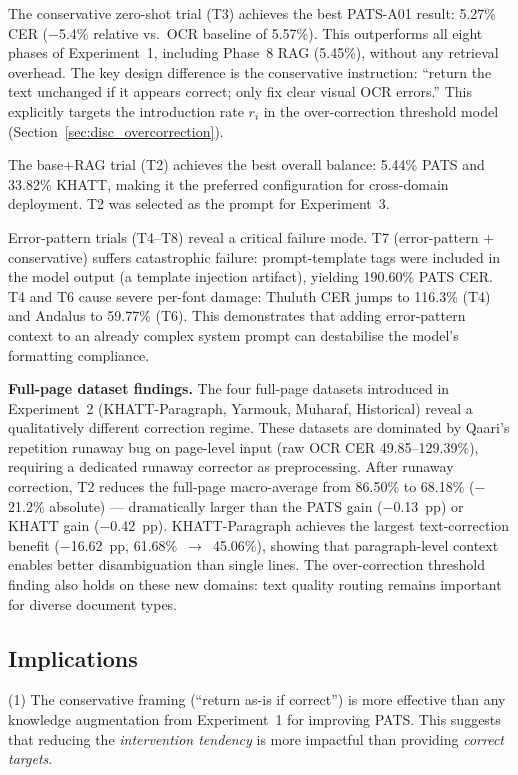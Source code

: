 The conservative zero-shot trial (T3) achieves the best PATS-A01 result:
5.27\% CER ($-$5.4\% relative vs.\ OCR baseline of 5.57\%). This outperforms
all eight phases of Experiment~1, including Phase~8 RAG (5.45\%), without
any retrieval overhead. The key design difference is the conservative
instruction: ``return the text unchanged if it appears correct; only fix
clear visual OCR errors.'' This explicitly targets the introduction rate
$r_i$ in the over-correction threshold model
(Section~\ref{sec:disc_overcorrection}).

The base+RAG trial (T2) achieves the best overall balance: 5.44\% PATS
and 33.82\% KHATT, making it the preferred configuration for cross-domain
deployment. T2 was selected as the prompt for Experiment~3.

Error-pattern trials (T4--T8) reveal a critical failure mode. T7
(error-pattern + conservative) suffers catastrophic failure: prompt-template
tags were included in the model output (a template injection artifact),
yielding 190.60\% PATS CER. T4 and T6 cause severe per-font damage:
Thuluth CER jumps to 116.3\% (T4) and Andalus to 59.77\% (T6). This
demonstrates that adding error-pattern context to an already complex
system prompt can destabilise the model's formatting compliance.

\textbf{Full-page dataset findings.}
The four full-page datasets introduced in Experiment~2 (KHATT-Paragraph,
Yarmouk, Muharaf, Historical) reveal a qualitatively different correction
regime. These datasets are dominated by Qaari's repetition runaway bug on
page-level input (raw OCR CER 49.85--129.39\%), requiring a dedicated
runaway corrector as preprocessing. After runaway correction, T2 reduces
the full-page macro-average from 86.50\% to 68.18\% ($-$21.2\% absolute)
--- dramatically larger than the PATS gain ($-$0.13~pp) or KHATT gain
($-$0.42~pp). KHATT-Paragraph achieves the largest text-correction benefit
($-$16.62~pp, 61.68\%~$\to$~45.06\%), showing that paragraph-level context
enables better disambiguation than single lines. The over-correction
threshold finding also holds on these new domains: text quality routing
remains important for diverse document types.

\subsection*{Implications}

(1) The conservative framing (``return as-is if correct'') is more effective
than any knowledge augmentation from Experiment~1 for improving PATS. This
suggests that reducing the \emph{intervention tendency} is more impactful
than providing \emph{correct targets}.

